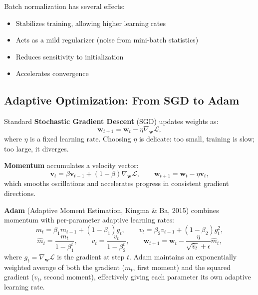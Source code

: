 \documentclass[12pt]{article}
\begin{document}
Batch normalization has several effects:
\begin{itemize}
    \item Stabilizes training, allowing higher learning rates
    \item Acts as a mild regularizer (noise from mini-batch statistics)
    \item Reduces sensitivity to initialization
    \item Accelerates convergence
\end{itemize}

\subsection{Adaptive Optimization: From SGD to Adam}

Standard \textbf{Stochastic Gradient Descent} (SGD) updates weights as:
\begin{equation}
    \mathbf{w}_{t+1} = \mathbf{w}_t - \eta \nabla_{\mathbf{w}} \mathcal{L},
    \label{t13eq:sgd}
\end{equation}
where $\eta$ is a fixed learning rate. Choosing $\eta$ is delicate: too small, training is slow; too large, it diverges.

\textbf{Momentum} accumulates a velocity vector:
\begin{equation}
    \mathbf{v}_t = \beta \mathbf{v}_{t-1} + (1 - \beta) \nabla_{\mathbf{w}} \mathcal{L}, \qquad
    \mathbf{w}_{t+1} = \mathbf{w}_t - \eta \mathbf{v}_t,
    \label{t13eq:momentum}
\end{equation}
which smooths oscillations and accelerates progress in consistent gradient directions.

\textbf{Adam} (Adaptive Moment Estimation, Kingma \& Ba, 2015) combines momentum with per-parameter adaptive learning rates:
\begin{equation}
    m_t = \beta_1 m_{t-1} + (1 - \beta_1) g_t, \qquad
    v_t = \beta_2 v_{t-1} + (1 - \beta_2) g_t^2,
    \label{t13eq:adam}
\end{equation}
\begin{equation}
    \hat{m}_t = \frac{m_t}{1 - \beta_1^t}, \qquad
    \hat{v}_t = \frac{v_t}{1 - \beta_2^t}, \qquad
    \mathbf{w}_{t+1} = \mathbf{w}_t - \frac{\eta}{\sqrt{\hat{v}_t} + \epsilon} \hat{m}_t,
    \label{t13eq:adam_update}
\end{equation}
where $g_t = \nabla_{\mathbf{w}} \mathcal{L}$ is the gradient at step $t$. Adam maintains an exponentially weighted average of both the gradient ($m_t$, first moment) and the squared gradient ($v_t$, second moment), effectively giving each parameter its own adaptive learning rate.
\end{document}
